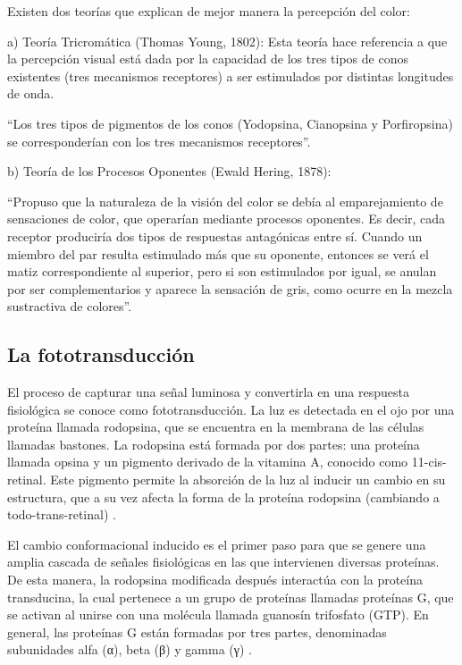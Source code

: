 \documentclass[10pt]{article}
\begin{document}
\setlength{\parskip}{2mm}

Existen dos teorías que explican de mejor manera la percepción del color:

a)	Teoría Tricromática (Thomas Young, 1802):
 Esta teoría hace referencia a que la  percepción visual está dada por la capacidad de los tres tipos de conos existentes (tres mecanismos receptores) a ser estimulados por distintas longitudes de onda. 
 
\setlength{\parskip}{2mm} 
 
“Los tres tipos de pigmentos de los conos (Yodopsina, Cianopsina y Porfiropsina) se corresponderían con los tres mecanismos receptores”\cite{IEEEreferencias:Ref14}.

\setlength{\parskip}{2mm}

b) Teoría de los Procesos Oponentes (Ewald Hering, 1878):
 
“Propuso que la naturaleza de la visión del color se debía al emparejamiento de sensaciones de color, que operarían mediante procesos oponentes. Es decir, cada receptor produciría dos tipos de respuestas antagónicas entre sí. Cuando un miembro del par resulta estimulado más que su oponente, entonces se verá el matiz correspondiente al superior, pero si son estimulados por igual, se anulan por ser complementarios y aparece la sensación de gris, como ocurre en la mezcla sustractiva de colores”\cite{IEEEreferencias:Ref14}.

\subsection{La fototransducción}

El proceso de capturar una señal luminosa y convertirla en una respuesta fisiológica se conoce como fototransducción. La luz es detectada en el ojo por una proteína llamada rodopsina, que se encuentra en la membrana de las células llamadas bastones. La rodopsina está formada por dos partes: una proteína llamada opsina y un pigmento derivado de la vitamina A, conocido como 11-cis-retinal. Este pigmento permite la absorción de la luz al inducir un cambio en su estructura, que a su vez afecta la forma de la proteína rodopsina (cambiando a todo-trans-retinal) \cite{IEEEreferencias:Ref12}.

\setlength{\parskip}{2mm}

El cambio conformacional inducido es el primer paso para que se genere una amplia cascada de señales fisiológicas en las que intervienen diversas proteínas. De esta manera, la rodopsina modificada después interactúa con la proteína transducina, la cual pertenece a un grupo de proteínas llamadas proteínas G, que se activan al unirse con una molécula llamada guanosín trifosfato (GTP). En general, las proteínas G están formadas por tres partes, denominadas subunidades alfa (α), beta (β) y gamma (γ) \cite{IEEEreferencias:Ref12}. 
\end{document}
